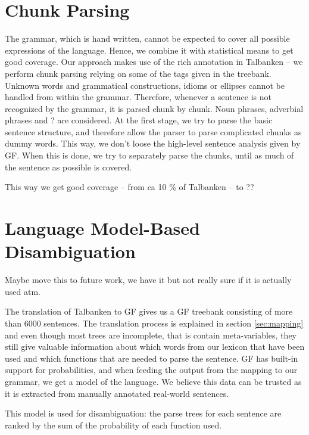 \documentclass[runningheads,a4paper]{llncs}
\begin{document}
\section{Chunk Parsing}

The grammar, which is hand written, cannot be expected to cover all
possible expressions of the language.
Hence, we combine it with statistical means to get good coverage. Our approach
makes use of the rich annotation in Talbanken -- we perform chunk parsing
relying on some of the tags given in the treebank. 
Unknown words and grammatical constructions, idioms or ellipses cannot be
handled from within the grammar.
Therefore, whenever a sentence is not recognized by the grammar, it is 
parsed chunk by chunk.
Noun phrases, adverbial phrases and ? are considered. At the first stage,
we try to parse the basic sentence structure, and therefore allow the parser
to parse complicated chunks as dummy words. This way, we don't loose the 
high-level sentence analysis given by GF.
When this is done, we try to separately parse the chunks,
until as much of the sentence as possible is covered. 

This way we get good coverage -- from ca 10 \% of Talbanken -- to ??

\section{Language Model-Based Disambiguation}

 Maybe move this to future work, we have it but not really sure
 if it is actually used atm.

The translation of Talbanken to GF gives us a GF treebank consisting of more than
6000 sentences. The translation process is explained in section
\ref{sec:mapping} and even though most trees are incomplete, that is contain
meta-variables, they still give valuable 
information about which words from our lexicon that have been used
and which functions that are needed to parse the sentence.
GF has built-in support for probabilities, and when feeding the output
from the mapping to our grammar, we get a model of the language. We believe
this data can be trusted as it is extracted from manually annotated 
real-world sentences.

This model is used for disambiguation: the parse trees for each sentence
are ranked by the sum of the probability of each function used.
\end{document}
